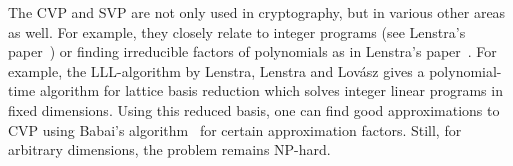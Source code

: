 \documentclass[11pt,a4paper]{article}
\begin{document}

The CVP and SVP are not only used in cryptography, but in various other areas as well. For example, they closely relate to integer programs (see Lenstra's paper~\cite{Len83}) or finding irreducible factors of polynomials as in Lenstra's paper~\cite{Len81}. For example, the LLL-algorithm by Lenstra, Lenstra and Lov\'{a}sz \cite{LLL} gives a polynomial-time algorithm for lattice basis reduction which solves integer linear programs in fixed dimensions. Using this reduced basis, one can find good approximations to CVP using Babai's algorithm~\cite{Babai86} for certain approximation factors. 
Still, for arbitrary dimensions, the problem remains NP-hard. 

\vspace{1cm}





\end{document}
